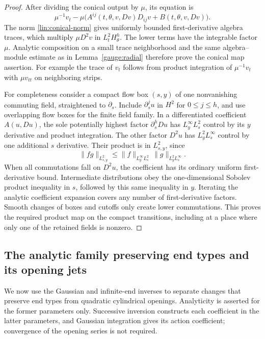\begin{proof}
After dividing the conical output by $\mu$, its equation is
\[
 \mu^{-1}v_t-\mu\bigl(A^{ij}(t,\theta,v,Dv)D_{ij}v
                                      +B(t,\theta,v,Dv)\bigr).
\]
The norm \eqref{lin:conical-norm} gives uniformly bounded
first-derivative algebra traces, which multiply $\mu D^2v$ in
$L^2_tH^h_\theta$.  The lower terms have the integrable factor
$\mu$.  Analytic composition on a small trace neighborhood and the
same algebra--module estimate as in Lemma~\ref{gauge:radial} therefore
prove the conical map assertion.
For example the trace of $v_t$ follows from product integration of
$\mu^{-1}v_t$ with $\mu v_{tt}$ on neighboring strips.

For completeness consider a compact flow box $(s,y)$ of one nonvanishing
commuting field, straightened to $\partial_s$.  Include
$\partial_s^j u$ in $H^2$ for $0\le j\le h$, and use overlapping
flow boxes for the finite field family.  In a differentiated coefficient
$A(u,Du)$, the sole potentially highest factor $\partial_s^h Du$ has
$L^\infty_yL^2_s$ control by its $y$ derivative and product integration.
The other factor $D^2u$ has $L^2_yL^\infty_s$ control by one additional
$s$ derivative.  Their product is in $L^2_{s,y}$, since
\[
 \|fg\|_{L^2_{s,y}}
 \le\|f\|_{L^\infty_yL^2_s}\,
       \|g\|_{L^2_yL^\infty_s}.
\]
When all commutations fall on $D^2u$, the coefficient has its ordinary
uniform first-derivative bound.  Intermediate distributions obey the
one-dimensional Sobolev product inequality in $s$, followed by this same
inequality in $y$.  Iterating the analytic coefficient expansion covers
any number of first-derivative factors.  Smooth changes of boxes and
cutoffs only create lower commutations.  This proves the required product
map on the compact transitions, including at a place where only one of
the retained fields is nonzero.
\end{proof}


\subsection{The analytic family preserving end types and its opening jets}

We now use the Gaussian and infinite-end inverses to separate changes that preserve end types from
quadratic cylindrical openings.  Analyticity is asserted for the former
parameters only.  Successive inversion constructs each coefficient in
the latter parameters, and Gaussian integration gives its action
coefficient; convergence of the opening series is not required.

